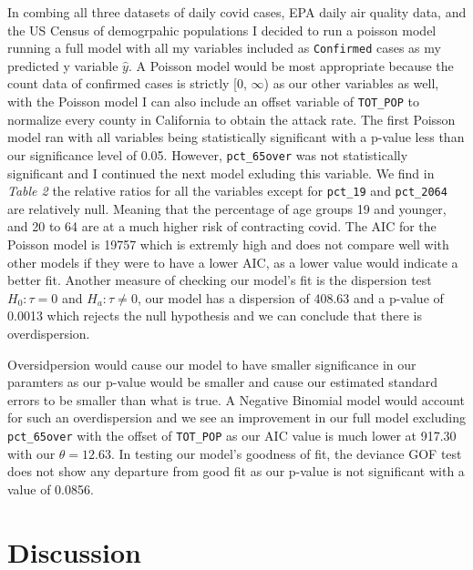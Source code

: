 \documentclass[
]{article}
\begin{document}
In combing all three datasets of daily covid cases, EPA daily air
quality data, and the US Census of demogrpahic populations I decided to
run a poisson model running a full model with all my variables included
as \texttt{Confirmed} cases as my predicted y variable \(\hat{y}\). A
Poisson model would be most appropriate because the count data of
confirmed cases is strictly {[}0, \(\infty\)) as our other variables as
well, with the Poisson model I can also include an offset variable of
\texttt{TOT\_POP} to normalize every county in California to obtain the
attack rate. The first Poisson model ran with all variables being
statistically significant with a p-value less than our significance
level of 0.05. However, \texttt{pct\_65over} was not statistically
significant and I continued the next model exluding this variable. We
find in \emph{Table 2} the relative ratios for all the variables except
for \texttt{pct\_19} and \texttt{pct\_2064} are relatively null. Meaning
that the percentage of age groups 19 and younger, and 20 to 64 are at a
much higher risk of contracting covid. The AIC for the Poisson model is
19757 which is extremly high and does not compare well with other models
if they were to have a lower AIC, as a lower value would indicate a
better fit. Another measure of checking our model's fit is the
dispersion test \(H_0: \tau = 0\) and \(H_a: \tau \ne 0\), our model has
a dispersion of 408.63 and a p-value of 0.0013 which rejects the null
hypothesis and we can conclude that there is overdispersion.

Oversidpersion would cause our model to have smaller significance in our
paramters as our p-value would be smaller and cause our estimated
standard errors to be smaller than what is true. A Negative Binomial
model would account for such an overdispersion and we see an improvement
in our full model excluding \texttt{pct\_65over} with the offset of
\texttt{TOT\_POP} as our AIC value is much lower at 917.30 with our
\(\theta = 12.63\). In testing our model's goodness of fit, the deviance
GOF test does not show any departure from good fit as our p-value is not
significant with a value of 0.0856.

\hypertarget{discussion}{%
\section{Discussion}\label{discussion}}
\end{document}
